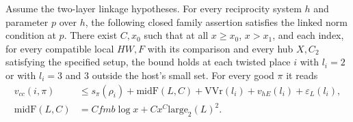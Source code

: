 
\begin{formalstatement}\label{sub:T25}

Assume the two-layer linkage hypotheses. For every reciprocity system $h$
and parameter $p$ over $h$, the following closed family assertion satisfies the
linked norm condition at $p$. There exist $C,x_0$ such that at all
$x\ge x_0$, $x>x_1$, and each index, for every compatible local
$HW,F$ with its comparison and every hub $X,C_2$ satisfying the specified
setup, the bound holds at each twisted place $i$ with $l_i=2$ or with
$l_i=3$ and $3$ outside the host's small set. For every good $\pi$ it reads
\[
 \begin{aligned}
 v_{cc}(i,\pi)&\le s_\pi(\rho_i)+\mathrm{midF}(L,C)
       +\mathrm{VVr}(l_i)+v_{hE}(l_i)+\varepsilon_L(l_i),\\
 \mathrm{midF}(L,C)&=C f m b\log x+C x^C\mathrm{large}_2(L)^2 .
 \end{aligned}
\]

\end{formalstatement}
